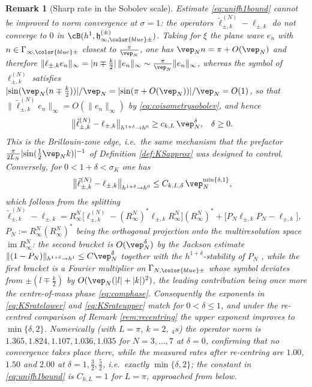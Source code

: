 \documentclass[a4paper, 11pt]{article}
\newcommand{\fh}{\mathfrak{h}}
\DeclareMathOperator{\1}{\mathds{1}}
\DeclareMathOperator{\im}{im}
\newtheorem{rem}[thm]{Remark}
\begin{document}
\begin{rem}[Sharp rate in the Sobolev scale]
\label{rem:KSconvrate}
Estimate \eqref{eq:unifh1bound} cannot be improved to norm convergence at $\sigma=1$: the operators $\tilde{\ell}^{(N)}_{\pm,k}-\ell_{\pm,k}$ do \emph{not} converge to $0$ in $\cB(h^{1},\fh^{(\pm)}_{\infty,{\color{blue}\pm}})$. Taking for $\xi$ the plane wave $e_{n}$ with $n\in\Gamma_{\infty,{\color{blue}\pm}}$ closest to $\tfrac{\pi}{\vep_{N}}$, one has $\vep_{N}n = \pi+O(\vep_{N})$ and therefore $\|\ell_{\pm,k}e_{n}\|_{\infty} = |n\mp\tfrac{k}{2}|\!\ \|e_{n}\|_{\infty}\sim\tfrac{\pi}{\vep_{N}}\|e_{n}\|_{\infty}$, whereas the symbol of $\ell^{(N)}_{\pm,k}$ satisfies $|\!\sin(\vep_{N}(n\mp\tfrac{k}{2}))|/\vep_{N} = |\!\sin(\pi+O(\vep_{N}))|/\vep_{N} = O(1)$, so that $\|\tilde{\ell}^{(N)}_{\pm,k}e_{n}\|_{\infty} = O(\|e_{n}\|_{\infty})$ by \eqref{eq:coisometrysobolev}, and hence
\begin{align}
\label{eq:KSratelower}
\big\|\tilde{\ell}^{(N)}_{\pm,k}-\ell_{\pm,k}\big\|_{h^{1+\delta}\rightarrow h^{0}} & \geq c_{k,L}\!\ \vep_{N}^{\delta}, & \delta & \geq0.
\end{align}
This is the Brillouin-zone edge, i.e.~the same mechanism that the prefactor $\tfrac{\pi}{2L_{N}}|\!\sin(\tfrac{1}{2}\vep_{N}k)|^{-1}$ of Definition \ref{def:KSapprox} was designed to control. Conversely, for $0<1+\delta<\sigma_{K}$ one has
\begin{align}
\label{eq:KSrateupper}
\big\|\tilde{\ell}^{(N)}_{\pm,k}-\ell_{\pm,k}\big\|_{h^{1+\delta}\rightarrow h^{0}} & \leq C_{k,L,\delta}\!\ \vep_{N}^{\min\{\delta,1\}},
\end{align}
which follows from the splitting $\tilde{\ell}^{(N)}_{\pm,k}-\ell_{\pm,k} = R^{N}_{\infty}\big[\ell^{(N)}_{\pm,k}-(R^{N}_{\infty})^{*}\ell_{\pm,k}R^{N}_{\infty}\big](R^{N}_{\infty})^{*}+\big[P_{N}\ell_{\pm,k}P_{N}-\ell_{\pm,k}\big]$, $P_{N}:=R^{N}_{\infty}(R^{N}_{\infty})^{*}$ being the orthogonal projection onto the multiresolution space $\im R^{N}_{\infty}$: the second bracket is $O(\vep_{N}^{\delta})$ by the Jackson estimate $\|(1-P_{N})\|_{h^{1+\delta}\rightarrow h^{1}}\leq C\vep_{N}^{\delta}$ together with the $h^{1+\delta}$-stability of $P_{N}$ \cite{DaubechiesTenLecturesOn}, while the first bracket is a Fourier multiplier on $\Gamma_{N,{\color{blue}\pm}}$ whose symbol deviates from $\pm(l\mp\tfrac{k}{2})$ by $O(\vep_{N}(|l|+|k|)^{2})$, the leading contribution being once more the centre-of-mass phase \eqref{eq:comphase}. Consequently the exponents in \eqref{eq:KSratelower} and \eqref{eq:KSrateupper} match for $0<\delta\leq1$, and under the re-centred comparison of Remark \ref{rem:recentring} the upper exponent improves to $\min\{\delta,2\}$. Numerically (with $L=\pi$, $k=2$, $_{4}s$) the operator norm is $1.365, 1.824, 1.107, 1.036, 1.035$ for $N=3,\dots,7$ at $\delta=0$, confirming that no convergence takes place there, while the measured rates after re-centring are $1.00$, $1.50$ and $2.00$ at $\delta=1,\tfrac{3}{2},\tfrac{5}{2}$, i.e.~exactly $\min\{\delta,2\}$; the constant in \eqref{eq:unifh1bound} is $C_{k,L}=1$ for $L=\pi$, approached from below.
\end{rem}
\end{document}
